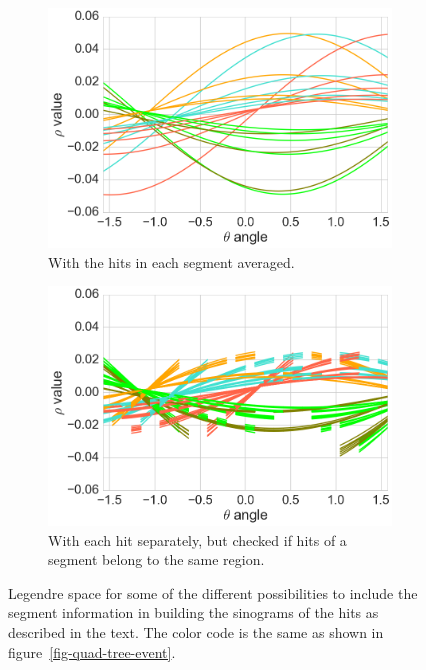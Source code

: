 \begin{figure}
  \begin{subfigure}[t]{0.48\linewidth}
    \includegraphics[width=\linewidth]{figures/workflow/quad_tree_averaged_hits.png}
    \caption{With the hits in each segment averaged.}
    \label{fig-quad-tree-averaged-hits}
  \end{subfigure}
  \begin{subfigure}[t]{0.48\linewidth}
    \centering
    \includegraphics[width=\linewidth]{figures/workflow/quad_tree_piecewise.png}  
    \caption{With each hit separately, but checked if hits of a segment belong to the same region.}
    \label{fig-quad-tree-piece}
  \end{subfigure}
  
  \caption{Legendre space for some of the different possibilities to include the segment information in building the sinograms of the hits as described in the text. The color code is the same as shown in figure~\ref{fig-quad-tree-event}.}
\end{figure}

